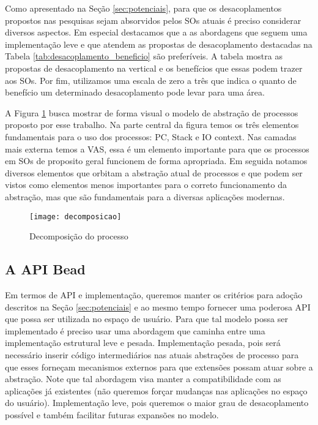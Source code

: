Como apresentado na Seção \ref{sec:potenciais}, para que os desacoplamentos
propostos nas pesquisas sejam absorvidos pelos SOs atuais é preciso considerar
diversos aspectos. Em especial destacamos que a as abordagens que seguem uma
implementação leve e que atendem as propostas de desacoplamento destacadas na
Tabela \ref{tab:desacoplamento_beneficio} são preferíveis. A tabela mostra as
propostas de desacoplamento na vertical e os benefícios que essas podem trazer
aos SOs. Por fim, utilizamos uma escala de zero a três  que indica o
quanto de benefício um determinado desacoplamento pode levar para uma área.



A Figura \ref{fig:decomposicao_proc} busca mostrar de forma visual o modelo de
abstração de processos proposto por esse trabalho. Na parte central da figura
temos os três elementos fundamentais para o uso dos processos: PC, Stack e IO
context. Nas camadas mais externa temos a VAS, essa é um elemento importante para
que os processos em SOs de proposito geral funcionem de forma apropriada. Em
seguida notamos diversos elementos que orbitam a abstração atual de processos e
que podem ser vistos como elementos menos importantes para o correto
funcionamento da abstração, mas que são fundamentais para a diversas aplicações
modernas.

\begin{figure}[!h]
  \centering
  \texttt{[image: decomposicao]}
  \caption{Decomposição do processo}
  \label{fig:decomposicao_proc}
\end{figure}

\subsection{A API Bead}
\label{sec:api}

Em termos de API e implementação, queremos manter os critérios para adoção
descritos na Seção \ref{sec:potenciais} e ao mesmo tempo fornecer uma poderosa
API que possa ser utilizada no espaço de usuário. Para que tal modelo possa ser
implementado é preciso usar uma abordagem que caminha entre uma implementação
estrutural leve e pesada. Implementação pesada, pois será necessário inserir
código intermediários nas atuais abstrações de processo para que esses forneçam
mecanismos externos para que extensões possam atuar sobre a abstração. Note que
tal abordagem visa manter a compatibilidade com as aplicações já existentes
(não queremos forçar mudanças nas aplicações no espaço do usuário).
Implementação leve, pois queremos o maior grau de desacoplamento possível e
também facilitar futuras expansões no modelo.

